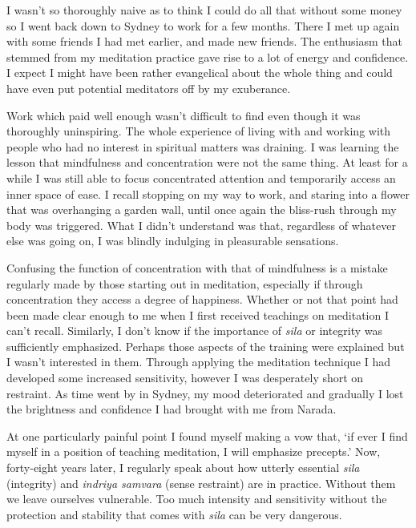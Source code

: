 I wasn't so thoroughly naive as to think I could do all that without
some money so I went back down to Sydney to work for a few months. There
I met up again with some friends I had met earlier, and made new
friends. The enthusiasm that stemmed from my meditation practice gave
rise to a lot of energy and confidence. I expect I might have been
rather evangelical about the whole thing and could have even put
potential meditators off by my exuberance.

\enlargethispage{\baselineskip}

Work which paid well enough wasn't difficult to find even though it was
thoroughly uninspiring. The whole experience of living with and working
with people who had no interest in spiritual matters was draining. I was
learning the lesson that mindfulness and concentration were not the same
thing. At least for a while I was still able to focus concentrated
attention and temporarily access an inner space of ease. I recall
stopping on my way to work, and staring into a flower that was
overhanging a garden wall, until once again the bliss-rush through my
body was triggered. What I didn't understand was that, regardless of
whatever else was going on, I was blindly indulging in pleasurable
sensations.

Confusing the function of concentration with that of mindfulness is a
mistake regularly made by those starting out in meditation, especially
if through concentration they access a degree of happiness. Whether or
not that point had been made clear enough to me when I first received
teachings on meditation I can't recall. Similarly, I don't know if the
importance of \emph{sila} or integrity was sufficiently emphasized.
Perhaps those aspects of the training were explained but I wasn't
interested in them. Through applying the meditation technique I had
developed some increased sensitivity, however I was desperately short on
restraint. As time went by in Sydney, my mood deteriorated and gradually
I lost the brightness and confidence I had brought with me from Narada.

\enlargethispage{\baselineskip}

At one particularly painful point I found myself making a vow that, `if
ever I find myself in a position of teaching meditation, I will
emphasize precepts.' Now, forty-eight years later,
I regularly speak about how utterly essential \emph{sila} (integrity)
and \emph{indriya samvara} (sense restraint) are in practice. Without
them we leave ourselves vulnerable. Too much intensity and sensitivity
without the protection and stability that comes with \emph{sila} can be
very dangerous.

